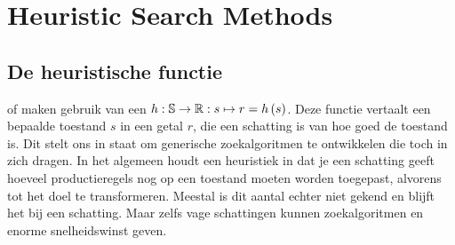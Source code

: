 \section{Heuristic Search Methods}
\subsection{De heuristische functie}
\label{sss:heuristicFunction}
 of  maken gebruik van een  $h:\mathbb{S}\rightarrow\mathbb{R}:s\mapsto r=h\left(s\right)$. Deze functie vertaalt een bepaalde toestand $s$ in een getal $r$, die een schatting is van hoe goed de toestand is. Dit stelt ons in staat om generische zoekalgoritmen te ontwikkelen die toch  in zich dragen. In het algemeen houdt een heuristiek in dat je een schatting geeft hoeveel productieregels nog op een toestand moeten worden toegepast, alvorens tot het doel te transformeren. Meestal is dit aantal echter niet gekend en blijft het bij een schatting. Maar zelfs vage schattingen kunnen zoekalgoritmen en enorme snelheidswinst geven.
